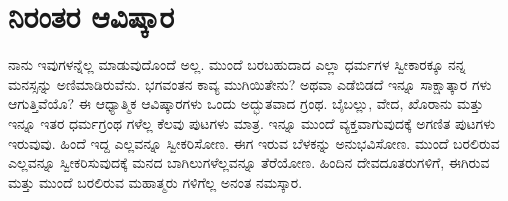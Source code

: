 \section{ನಿರಂತರ ಆವಿಷ್ಕಾರ}

ನಾನು ಇವುಗಳನ್ನೆಲ್ಲ ಮಾಡುವುದೊಂದೆ ಅಲ್ಲ. ಮುಂದೆ ಬರಬಹುದಾದ ಎಲ್ಲಾ ಧರ್ಮಗಳ ಸ್ವೀಕಾರಕ್ಕೂ ನನ್ನ ಮನಸ್ಸನ್ನು ಅಣಿಮಾಡಿರುವೆನು. ಭಗವಂತನ ಕಾವ್ಯ ಮುಗಿಯಿತೇನು? ಅಥವಾ ಎಡೆಬಿಡದೆ ಇನ್ನೂ ಸಾಕ್ಷಾತ್ಕಾರ ಗಳು ಆಗುತ್ತಿವೆಯೊ? ಈ ಆಧ್ಯಾತ್ಮಿಕ ಆವಿಷ್ಕಾರಗಳು ಒಂದು ಅದ್ಭುತವಾದ ಗ್ರಂಥ. ಬೈಬಲ್ಲು, ವೇದ, ಖೊರಾನು ಮತ್ತು ಇನ್ನೂ ಇತರ ಧರ್ಮಗ್ರಂಥ ಗಳೆಲ್ಲ ಕೆಲವು ಪುಟಗಳು ಮಾತ್ರ. ಇನ್ನೂ ಮುಂದೆ ವ್ಯಕ್ತವಾಗುವುದಕ್ಕೆ ಅಗಣಿತ ಪುಟಗಳು ಇರುವುವು. ಹಿಂದೆ ಇದ್ದ ಎಲ್ಲವನ್ನೂ ಸ್ವೀಕರಿಸೋಣ. ಈಗ ಇರುವ ಬೆಳಕನ್ನು ಅನುಭವಿಸೋಣ. ಮುಂದೆ ಬರಲಿರುವ ಎಲ್ಲವನ್ನೂ ಸ್ವೀಕರಿಸುವುದಕ್ಕೆ ಮನದ ಬಾಗಿಲುಗಳೆಲ್ಲವನ್ನೂ ತೆರೆಯೋಣ. ಹಿಂದಿನ ದೇವದೂತರುಗಳಿಗೆ, ಈಗಿರುವ ಮತ್ತು ಮುಂದೆ ಬರಲಿರುವ ಮಹಾತ್ಮರು ಗಳಿಗೆಲ್ಲ ಅನಂತ ನಮಸ್ಕಾರ.

